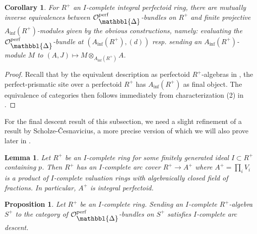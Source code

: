 \documentclass[10pt,twoside]{article}
\numberwithin{equation}{section}
\theoremstyle{plain}
\newtheorem{myprop}[mythm]{Proposition}
\newtheorem{mylemma}[mythm]{Lemma}
\newtheorem{mycor}[mythm]{Corollary}
\theoremstyle{definition}
\newcommand{\MCO}{\mathcal{O}}
\DeclareMathOperator{\perf}{perf}
\newcommand{\Prism}{{\mathlarger{\mathbbl{\Delta}}}}
\DeclareMathOperator{\Inf}{inf}
\newcommand{\Ainf}{A_{\Inf}}
\newcommand{\OpP}{\MCO^{\perf}_{\Prism}}
\begin{document}
\begin{mycor}\label{CrysForPerfdRings}
For \(R^+\) an \(I\)-complete integral perfectoid ring, there are mutually inverse equivalences between \(\OpP\)-bundles on \(R^+\) and finite projective \(\Ainf(R^+)\)-modules given by the obvious constructions, namely: evaluating the \(\OpP\)-bundle at \((\Ainf(R^+),(d))\) resp. sending an \(\Ainf(R^+)\)-module \(M\) to \((A,J)\mapsto M\otimes_{\Ainf(R^+)} A\).
\end{mycor}

\begin{proof}
Recall that by the equivalent description as perfectoid \(R^+\)-algebras in , the perfect-prismatic site over a perfectoid \(R^+\) has \(\Ainf(R^+)\) as final object. The equivalence of categories then follows immediately from characterization (2) in .
\end{proof}


For the final descent result of this subsection, we need a slight refinement of a result by Scholze-\v{C}esnavicius, a more precise version of which we will also prove later in .

\begin{mylemma}\label{LemmaSC}\emph{\cite[Lemma 2.2.3]{CS21}} %
    Let \(R^+\) be an \(I\)-complete ring for some finitely generated ideal \(I\subset R^+\) containing \(p\). Then \(R^+\) has an \(I\)-complete arc cover \(R^+\to A^+\) where \(A^+=\prod_i V_i\) is a product of \(I\)-complete valuation rings with algebraically closed field of fractions. In particular, \(A^+\) is integral perfectoid.
\end{mylemma}

\begin{myprop}\label{arcDescentForCrysNew}
    Let \(R^+\) be an \(I\)-complete ring. Sending an \(I\)-complete \(R^+\)-algebra \(S^+\) to the category of \(\OpP\)-bundles on \(S^+\) satisfies \(I\)-complete arc descent.
\end{myprop}
\end{document}
